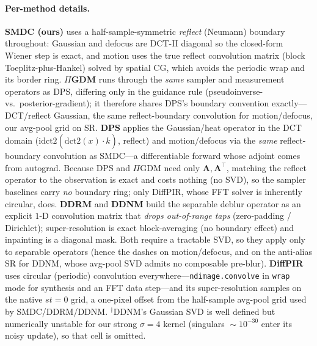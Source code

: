 \documentclass[11pt]{article}
\newcommand{\A}{\mathbf{A}}
\begin{document}
\paragraph{Per-method details.}
\textbf{SMDC (ours)} uses a half-sample-symmetric \emph{reflect} (Neumann) boundary throughout:
Gaussian and defocus are DCT-II diagonal so the closed-form Wiener step is exact, and motion uses the
true reflect convolution matrix (block Toeplitz-plus-Hankel) solved by spatial CG, which avoids the
periodic wrap and its border ring. \textbf{$\Pi$GDM} runs through the \emph{same} sampler and
measurement operators as DPS, differing only in the guidance rule (pseudoinverse- vs.\
posterior-gradient); it therefore shares DPS's boundary convention exactly---DCT/reflect Gaussian,
the same reflect-boundary convolution for motion/defocus, our avg-pool grid on SR. \textbf{DPS}
applies the Gaussian/heat operator in the DCT domain ($\mathrm{idct2}(\mathrm{dct2}(x)\cdot\hat k)$,
reflect) and motion/defocus via the \emph{same} reflect-boundary convolution as SMDC---a
differentiable forward whose adjoint comes from autograd. Because DPS and $\Pi$GDM need only
$\A,\A^\top$, matching the reflect operator to the observation is exact and costs nothing (no SVD),
so the sampler baselines carry \emph{no} boundary ring; only DiffPIR, whose FFT solver is inherently
circular, does.
\textbf{DDRM} and \textbf{DDNM} build the separable deblur operator as an explicit $1$-D convolution
matrix that \emph{drops out-of-range taps} (zero-padding / Dirichlet); super-resolution is exact
block-averaging (no boundary effect) and inpainting is a diagonal mask. Both require a tractable SVD,
so they apply only to separable operators (hence the dashes on motion/defocus, and on the anti-alias
SR for DDNM, whose avg-pool SVD admits no composable pre-blur). \textbf{DiffPIR} uses circular
(periodic) convolution everywhere---\texttt{ndimage.convolve} in \texttt{wrap} mode for synthesis and
an FFT data step---and its super-resolution samples on the native $st{=}0$ grid, a
one-pixel offset from the half-sample avg-pool grid used by SMDC/DDRM/DDNM.
$^\dagger$DDNM's Gaussian SVD is well defined but numerically unstable for our strong $\sigma{=}4$
kernel (singulars $\!\sim\!10^{-30}$ enter its noisy update), so that cell is omitted.
\end{document}
